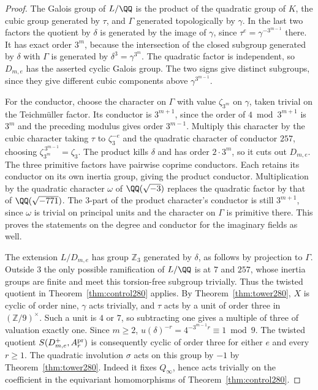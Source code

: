 \documentclass[a4paper,11pt]{article}
\theoremstyle{definition}
\theoremstyle{remark}
\newcommand{\ZZ}{\mathbb Z}\newcommand{\ord}{\operatorname{ord}}
\numberwithin{equation}{section}
\begin{document}
\begin{proof}
The Galois group of \(L/\QQ\) is the product of the quadratic
group of \(K\), the cubic group generated by \(\tau\), and
\(\Gamma\) generated topologically by \(\gamma\). In the last
two factors the quotient by \(\delta\) is generated by the
image of \(\gamma\), since \(\tau^e=\gamma^{-3^{m-1}}\) there.
It has exact order \(3^m\), because the intersection of the
closed subgroup generated by \(\delta\) with \(\Gamma\) is
generated by \(\delta^3=\gamma^{3^m}\). The quadratic factor
is independent, so \(D_{m,e}\) has the asserted cyclic Galois
group. The two signs give distinct subgroups, since they give
different cubic components above \(\gamma^{3^{m-1}}\).

For the conductor, choose the character on \(\Gamma\) with
value \(\zeta_{3^m}\) on \(\gamma\), taken trivial on the
Teichmüller factor. Its conductor is \(3^{m+1}\), since the
order of \(4\bmod 3^{m+1}\) is \(3^m\) and the preceding
modulus gives order \(3^{m-1}\). Multiply this character by
the cubic character taking \(\tau\) to \(\zeta_3^{-e}\) and
the quadratic character of conductor \(257\), choosing
\(\zeta_{3^m}^{\,3^{m-1}}=\zeta_3\). The product kills
\(\delta\) and has order \(2\cdot3^m\), so it cuts out \(D_{m,e}\).
The three primitive factors have pairwise coprime conductors.
Each retains its conductor on its own inertia group, giving
the product conductor. Multiplication by the quadratic character
\(\omega\) of \(\QQ(\sqrt{-3})\) replaces the quadratic factor
by that of \(\QQ(\sqrt{-771})\). The \(3\)-part of the product
character's conductor is still \(3^{m+1}\), since \(\omega\) is trivial on principal
units and the character on \(\Gamma\) is primitive there.
This proves the statements on the degree and conductor for
the imaginary fields as well.

The extension \(L/D_{m,e}\) has group \(\ZZ_3\) generated by
\(\delta\), as follows by projection to \(\Gamma\).
Outside \(3\) the only possible ramification of \(L/\QQ\)
is at \(7\) and \(257\), whose inertia groups are finite and
meet this torsion-free subgroup trivially. Thus the twisted
quotient in Theorem~\ref{thm:control280} applies.
By Theorem~\ref{thm:tower280}, \(X\) is cyclic of order nine,
\(\gamma\) acts trivially, and \(\tau\) acts by a unit of
order three in \((\ZZ/9)^\times\). Such a unit is \(4\) or
\(7\), so subtracting one gives a multiple of three of
valuation exactly one. Since \(m\ge2\),
\(u(\delta)^{-r}=4^{-3^{m-1}r}\equiv1\bmod9\).
The twisted quotient \(S(D_{m,e}^+,A_r^{\rm pr})\) is
consequently cyclic of order three for either \(e\) and
every \(r\ge1\). The quadratic involution \(\sigma\) acts on
this group by \(-1\) by Theorem~\ref{thm:tower280}. Indeed
it fixes \(Q_\infty\), hence acts trivially on the coefficient
in the equivariant homomorphisms of Theorem~\ref{thm:control280}.


\end{proof}
\end{document}
